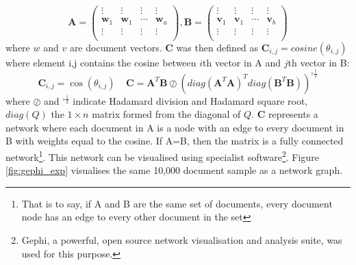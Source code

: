 $$\mathbf{A} = \left( \begin{array}{cccc}
\vdots & \vdots & \vdots & \vdots \\
\mathbf{w}_1 & \mathbf{w}_1 & \cdots & \mathbf{w}_a \\
\vdots & \vdots & \vdots & \vdots \\ \end{array} \right) , \mathbf{B} = \left( \begin{array}{cccc}
\vdots & \vdots & \vdots & \vdots \\
\mathbf{v}_1 & \mathbf{v}_1 & \cdots & \mathbf{v}_b \\
\vdots & \vdots & \vdots & \vdots \\ \end{array} \right)$$ where $w$ and $v$ are document vectors.
$\mathbf{C}$ was then defined as $\mathbf{C}_{i , j} = cosine \left(\theta_{i , j} \right)$ where element i,j contains the cosine between $i$th vector in A and $j$th vector in B:
$$\mathbf{C}_{i , j}=\cos(\theta_{i ,j}) \ \ \ \ \ \mathbf{C}=\mathbf{A}^T \mathbf{B} \oslash \left( diag(\mathbf{A}^T \mathbf{A})^T diag(\mathbf{B}^T \mathbf{B}) \right)^{\circ\frac12}$$
where $\oslash$ and $^{\circ\frac12}$ indicate Hadamard division and Hadamard square root, $diag(Q)$ the $1 \times n$ matrix formed from the diagonal of $Q$. $\mathbf{C}$ represents a network where each document in A is a node with an edge to every document in B with weights equal to the cosine. If A=B, then the matrix is a fully connected network\footnote{That is to say, if A and B are the same set of documents, every document node has an edge to every other document in the set}. This network can be visualised using specialist software\footnote{Gephi, a powerful, open source network visualisation and analysis suite, was used for this purpose. }\cite{gephi}. Figure \ref{fig:gephi_exp} visualises the same 10,000 document sample as a network graph.
